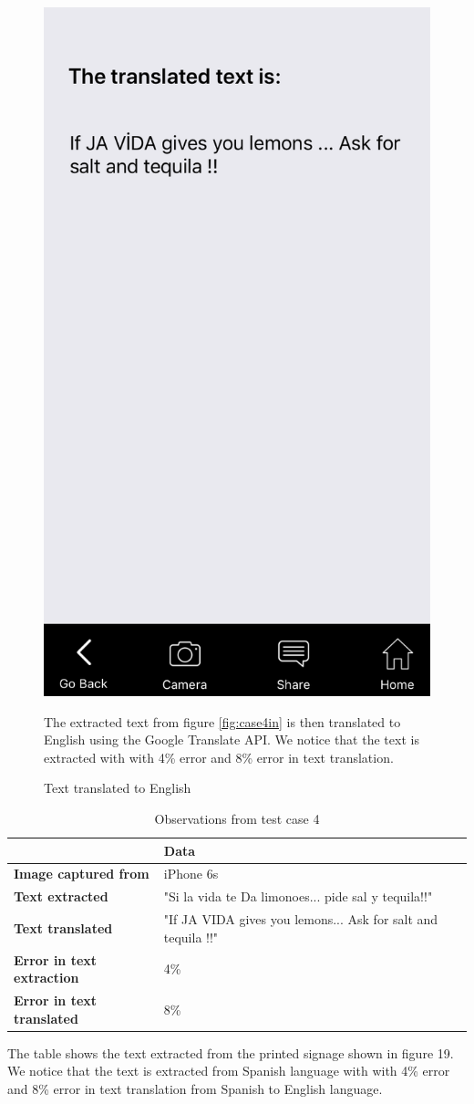 \documentclass[12pt]{article}
\begin{document}
       \begin{figure}[H]
	\centering
	\includegraphics[width=0.5\linewidth]{media/case4b.png}
	\caption{Text translated to English}{The extracted text from figure \ref{fig:case4in} is then translated to English using the Google Translate API. We notice that the text is extracted with with 4\% error and 8\% error in text translation.}
	\label{fig:engs}
\end{figure} 

\begin{table}%
    \centering
   
    \label{my-label4}
       \begin{tabular}{|p{30mm}|p{55mm}|p{35mm}|}
 \hline
  & \textbf{Data}  \\ [0.5ex] 
 \hline\hline
 \textbf{Image captured from} & iPhone 6s \\
 \hline
  \textbf{Text extracted} & "Si la vida te Da limonoes... pide sal y tequila!!"  \\
 \hline
 \textbf{Text translated} & "If JA VIDA gives you lemons... Ask for salt and tequila !!"   \\
 \hline
 \textbf{Error in text extraction} & 4\%   \\
 \hline
 \textbf{Error in text translated} & 8\%   \\ [1ex] 
 \hline
    \end{tabular}
     \caption{Observations from test case 4} {The table shows the text extracted from the printed signage shown in figure 19. We notice that the text is extracted from Spanish language with with 4\% error and 8\% error in text translation from Spanish to English language.}
\end{table}
\end{document}
